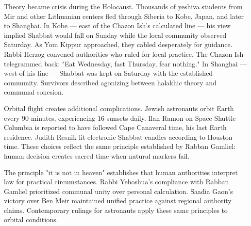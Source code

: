 Theory became crisis during the Holocaust. Thousands of yeshiva students from Mir and other Lithuanian centers fled through Siberia to Kobe, Japan, and later to Shanghai. In Kobe — east of the Chazon Ish's calculated line — his view implied Shabbat would fall on Sunday while the local community observed Saturday. As Yom Kippur approached, they cabled desperately for guidance. Rabbi Herzog convened authorities who ruled for local practice. The Chazon Ish telegrammed back: "Eat Wednesday, fast Thursday, fear nothing." In Shanghai — west of his line — Shabbat was kept on Saturday with the established community. Survivors described agonizing between halakhic theory and communal cohesion. 

Orbital flight creates additional complications. Jewish astronauts orbit Earth every 90 minutes, experiencing 16 sunsets daily. Ilan Ramon on Space Shuttle Columbia is reported to have followed Cape Canaveral time, his last Earth residence. Judith Resnik lit electronic Shabbat candles according to Houston time. These choices reflect the same principle established by Rabban Gamliel: human decision creates sacred time when natural markers fail.

The principle "it is not in heaven" establishes that human authorities interpret law for practical circumstances. Rabbi Yehoshua's compliance with Rabban Gamliel prioritized communal unity over personal calculation. Saadia Gaon's victory over Ben Meir maintained unified practice against regional authority claims. Contemporary rulings for astronauts apply these same principles to orbital conditions.
